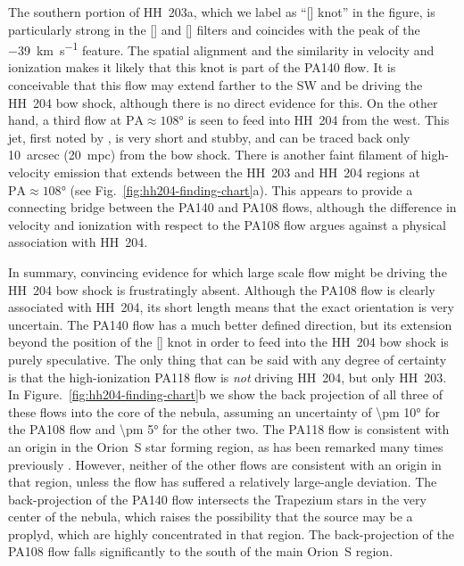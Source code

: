 \documentclass[twocolumn]{aastex63}
\begin{document}
The southern portion of HH~203a,
which we label as ``[] knot'' in the figure,
is particularly strong in the [] and [] filters
and coincides with the peak of the \SI{-39}{km.s^{-1}} feature.
The spatial alignment and the similarity in velocity and ionization makes it likely that this
knot is part of the PA140 flow.
It is conceivable that this flow may extend farther to the SW and
be driving the HH~204 bow shock,
although there is no direct evidence for this.
On the other hand, a third flow at \(\mathrm{PA} \approx \ang{108}\) is seen to feed into HH~204
from the west.
This jet, first noted by \cite{Doi:2004a}, is very short and stubby,
and can be traced back only \SI{10}{arcsec} (\SI{20}{mpc}) from the bow shock.
There is another faint filament of high-velocity \oiii{} emission that extends between the
HH~203 and HH~204 regions at \(\mathrm{PA} \approx \ang{108}\)
(see Fig.~\ref{fig:hh204-finding-chart}a).
This appears to provide a connecting bridge
between the PA140 and PA108 flows, although the difference
in velocity and ionization with respect to the PA108 flow argues against
a physical association with HH~204. 

In summary, convincing evidence for which large scale flow might be driving the
HH~204 bow shock is frustratingly absent.
Although the PA108 flow is clearly associated with HH~204, its short length means
that the exact orientation is very uncertain.
The PA140 flow has a much better defined direction,
but its extension beyond the position of the [] knot
in order to feed into the HH~204 bow shock is purely speculative.
The only thing that can be said with any degree of certainty is that the
high-ionization PA118 flow is \emph{not} driving HH~204, but only HH~203.
In Figure.~\ref{fig:hh204-finding-chart}b we show the back projection of
all three of these flows into the core of the nebula,
assuming an uncertainty of \ang{\pm 10} for the PA108 flow
and \ang{\pm 5} for the other two.
The PA118 flow is consistent with an origin in the Orion~S
star forming region,
as has been remarked many times previously
\citep{ODell:1997a, Rosado:2002e, ODell:2003n}.
However, neither of the other flows are consistent with an origin in that region,
unless the flow has suffered a relatively large-angle deviation.
The back-projection of the PA140 flow intersects the Trapezium stars
in the very center of the nebula, which raises the possibility that the source
may be a proplyd, which are highly concentrated in that region.
The back-projection of the PA108 flow falls significantly to the south
of the main Orion~S region.



\end{document}

